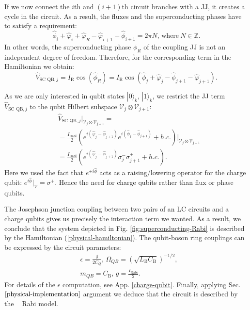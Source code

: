 \documentclass[reprint, aps, prx, amsmath, amssymb, longbibliography, superscriptaddress]{revtex4-2}
\DeclareMathOperator{\Zthree}{\mathbb{Z}_3}
\begin{document}
If we now connect the $i$th and $(i+1)$th circuit branches with a JJ, it creates a cycle in the circuit. As a result, the fluxes and the superconducting phases have to satisfy a requirement:
\begin{equation}
  \hat \phi_i + \hat\varphi_i + \hat\varphi_R - \hat\varphi_{i+1} - \hat\phi_{i+1} = 2\pi N, \, \text{where}\ N \in \mathbb{Z}.
\end{equation}
In other words, the superconducting phase $\phi_R$ of the coupling JJ is not an independent degree of freedom. Therefore, for the corresponding term in the Hamiltonian we obtain:
\begin{equation}
    \hat V_{\text{SC QB},j} = I_{\text{R}} \cos(\hat \phi_R) =  I_{\text{R}}\cos(\hat \phi_j + \hat \varphi_j - \hat \phi_{j+1} - \hat \varphi_{j+1}).
\end{equation}


As we are only interested in qubit states $|0\rangle_k,\, |1\rangle_k$, we restrict the JJ term $\hat V_{\text{SC QB},j}$ to the qubit Hilbert subspace $\mathcal{V}_j\otimes \mathcal{V}_{j+1}$:
\begin{equation}
\begin{aligned}
    &\hat V_{\text{SC QB},j} \bigg |_{\mathcal{V}_j\otimes \mathcal{V}_{j+1}} = \\
    &=\frac{I_{\text{Rabi}}}{2}\left(e^{i(\hat\varphi_j - \hat\varphi_{j+1})} e^{i(\hat\phi_j - \hat\phi_{j+1})} + h.c. \right) \bigg|_{\mathcal{V}_j\otimes \mathcal{V}_{j+1}} \\
    &=\frac{I_{\text{Rabi}}}{2}\left(e^{i(\hat\varphi_j - \hat\varphi_{j+1})} \sigma_j^- \sigma_{j+1}^+ + h.c. \right).
\end{aligned}
\end{equation}
Here we used the fact that $e^{\pm i\hat\phi}$ acts as a raising/lowering operator for the charge qubit: $e^{i\hat\phi}|_{\mathcal{V}} = \sigma^+$. Hence the need for charge qubits rather than flux or phase qubits.

The Josephson junction coupling between two pairs of an LC circuits and a charge qubits gives us precisely the interaction term we wanted. As a result, we conclude that the system depicted in Fig. \ref{fig:superconducting-Rabi} is described by the Hamiltonian (\ref{physical-hamiltonian}).  The qubit-boson ring couplings can be expressed by the circuit parameters:
\begin{equation}
\begin{aligned}
    &\epsilon = \frac{\delta}{2 C_Q},\,
    \Omega_{QB} = \left(\sqrt{L_{\text{B}}C_{\text{B}}}\right)^{-1/2}, \\
    &m_{QB} = C_{\text{B}}, \, g = \frac{I_{\text{Rabi}}}{2}.
\end{aligned}
\end{equation}
For details of the $\epsilon$ computation, see App. \ref{charge-qubit}. Finally, applying Sec. $\ref{physical-implementation}$ argument we deduce that the circuit is described by the $\Zthree$ Rabi model.
\end{document}
